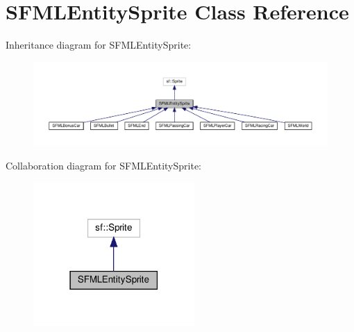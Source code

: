 \hypertarget{classSFMLEntitySprite}{}\section{S\+F\+M\+L\+Entity\+Sprite Class Reference}
\label{classSFMLEntitySprite}


Inheritance diagram for S\+F\+M\+L\+Entity\+Sprite\+:\nopagebreak
\begin{figure}[H]
\begin{center}
\leavevmode
\includegraphics[width=350pt]{classSFMLEntitySprite__inherit__graph}
\end{center}
\end{figure}


Collaboration diagram for S\+F\+M\+L\+Entity\+Sprite\+:\nopagebreak
\begin{figure}[H]
\begin{center}
\leavevmode
\includegraphics[width=174pt]{classSFMLEntitySprite__coll__graph}
\end{center}
\end{figure}
